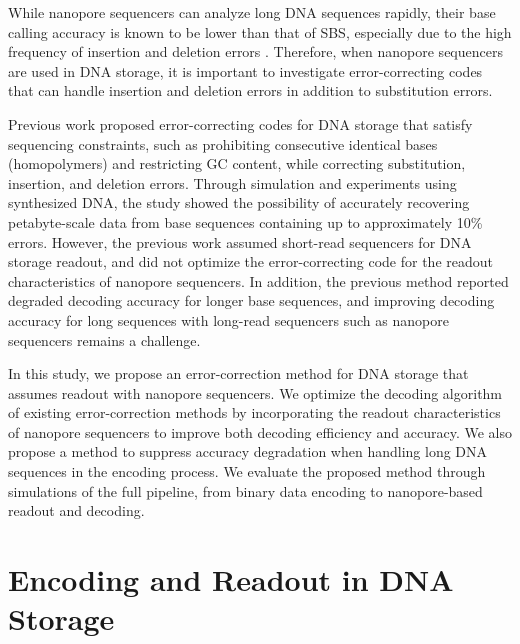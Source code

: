 \documentclass[sotsuron]{kuee}
\begin{document}
While nanopore sequencers can analyze long DNA sequences rapidly, their base
calling accuracy is known to be lower than that of SBS, especially due to the
high frequency of insertion and deletion errors
\cite{Amarasinghe2020,Dorey2024}.
Therefore, when nanopore sequencers are used in DNA storage, it is important to
investigate error-correcting codes that can handle insertion and deletion
errors in addition to substitution errors.

Previous work proposed error-correcting codes for DNA storage that satisfy
sequencing constraints, such as prohibiting consecutive identical bases
(homopolymers) and restricting GC content, while correcting substitution,
insertion, and deletion errors.
Through simulation and experiments using synthesized DNA, the study showed the
possibility of accurately recovering petabyte-scale data from base sequences
containing up to approximately 10\% errors\cite{HEDGES}.
However, the previous work assumed short-read sequencers for DNA storage
readout, and did not optimize the error-correcting code for the readout
characteristics of nanopore sequencers.
In addition, the previous method reported degraded decoding accuracy for longer
base sequences, and improving decoding accuracy for long sequences with
long-read sequencers such as nanopore sequencers remains a challenge.

In this study, we propose an error-correction method for DNA storage that
assumes readout with nanopore sequencers.
We optimize the decoding algorithm of existing error-correction methods by
incorporating the readout characteristics of nanopore sequencers to improve
both decoding efficiency and accuracy.
We also propose a method to suppress accuracy degradation when handling long
DNA sequences in the encoding process.
We evaluate the proposed method through simulations of the full pipeline, from
binary data encoding to nanopore-based readout and decoding.

\chapter{Encoding and Readout in DNA Storage}
\end{document}
